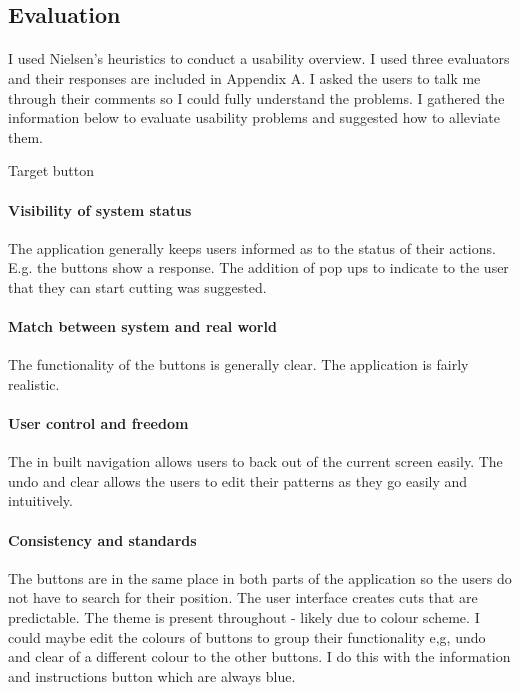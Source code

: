 \documentclass[11pt]{article}
\begin{document}
            \subsection{Evaluation}
            
                \paragraph{}
                I used Nielsen's heuristics to conduct a usability overview. I used three evaluators and their responses are included in Appendix A. I asked the users to talk me through their comments so I could fully understand the problems. I gathered the information below to evaluate usability problems and suggested how to alleviate them. 

                Target button 
                
                
                \paragraph{Visibility of system status}
                The application generally keeps users informed as to the status of their actions. E.g. the buttons show a response. The addition of pop ups to indicate to the user that they can start cutting was suggested. 
                
                \paragraph{Match between system and real world}
                The functionality of the buttons is generally clear. The application is fairly realistic. 
                
                \paragraph{User control and freedom}
                The in built navigation allows users to back out of the current screen easily. The undo and clear allows the users to edit their patterns as they go easily and intuitively. 

                \paragraph{Consistency and standards}
                The buttons are in the same place in both parts of the application so the users do not have to search for their position. The user interface creates cuts that are predictable. The theme is present throughout - likely due to colour scheme. I could maybe edit the colours of buttons to group their functionality e,g, undo and clear of a different colour to the other buttons. I do this with the information and instructions button which are always blue. 
\end{document}
